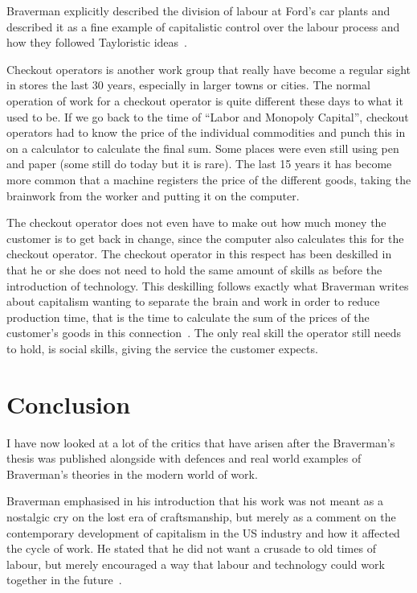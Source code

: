 \documentclass[a4paper,12pt,titlepage]{article}
\begin{document}
  Braverman explicitly described the division of labour at Ford's car
  plants and described it as a fine example of capitalistic control over
  the labour process and how they followed Tayloristic
  ideas~\cite[146-151]{hb}.
  
  Checkout operators is another work group that really have become
  a regular sight in stores the last 30 years, especially in
  larger towns or cities. The normal operation of work for
  a checkout operator is quite different these days to what it used
  to be. If we go back to the time of 
  ``Labor and Monopoly Capital'', checkout operators had to
  know the price of the individual commodities and punch this
  in on a calculator to calculate the final sum. Some places were
  even still using pen and paper (some still do today but it is rare).
  The last 15 years it has become more common that a machine
  registers the price of the different goods, taking the
  brainwork from the worker and putting it on the computer.

  The checkout operator does not even have to make out
  how much money the customer is to get back in change, since
  the computer also calculates this for the checkout operator.
  The checkout operator in this respect has been deskilled in
  that he or she does not need to hold the same amount of
  skills as before the introduction of technology. This deskilling
  follows exactly what Braverman writes about capitalism
  wanting to separate the brain and work in order to reduce
  production time, that is the time to calculate the sum of
  the prices of the customer's goods in this
  connection~\cite[120-126]{hb}.
  The only real skill the operator still needs to hold, is social skills,
  giving the service the customer expects.

  \section{Conclusion}
  I have now looked at a lot of the critics that have arisen after
  the Braverman's thesis was published alongside with defences and
  real world examples of Braverman's theories in the modern world
  of work.
  
  Braverman emphasised in his introduction that his work
  was not meant as a nostalgic cry on the lost era of
  craftsmanship, but merely as a comment on the contemporary
  development of capitalism in the US industry and how it
  affected the cycle of work. He stated that he did not want a 
  crusade to old times of labour, but merely encouraged
  a way that labour and technology could work
  together in the future~\cite[7]{hb}.
\end{document}
